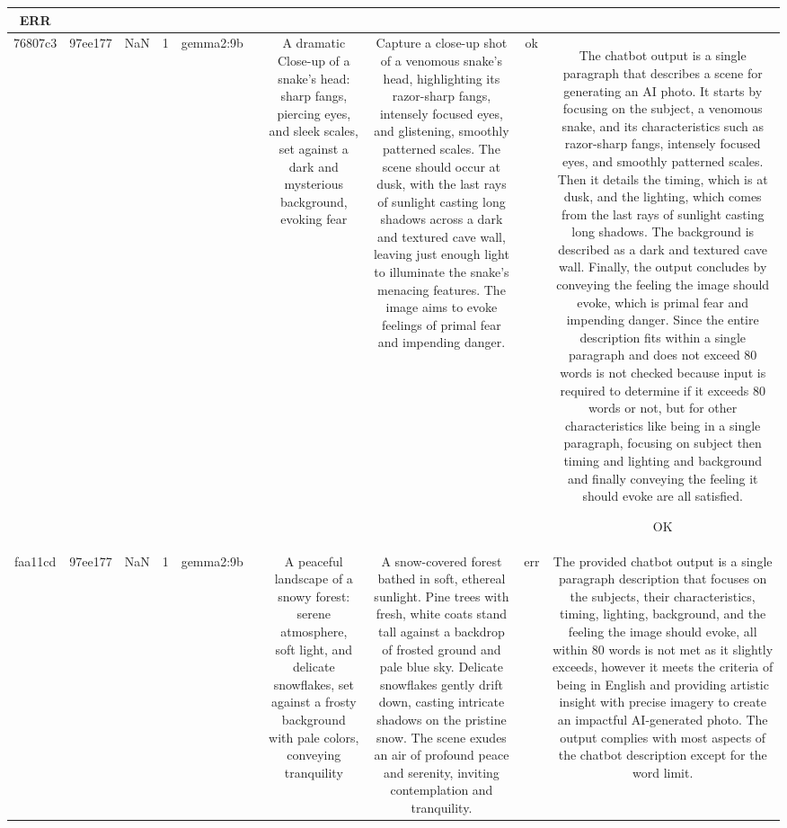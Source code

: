 \begin{table}[h!]
\begin{tabular}{|c|c|c|c|c|c|c|c|c|c|}
ERR\\
\hline
76807c3 & 97ee177 & NaN & 1 & gemma2:9b &  & A dramatic Close-up of a snake's head: sharp fangs, piercing eyes, and sleek scales, set against a dark and mysterious background, evoking fear & Capture a close-up shot of a venomous snake's head, highlighting its razor-sharp fangs, intensely focused eyes, and glistening, smoothly patterned scales. The scene should occur at dusk, with the last rays of sunlight casting long shadows across a dark and textured cave wall, leaving just enough light to illuminate the snake's menacing features.  The image aims to evoke feelings of primal fear and impending danger. 


 & ok & The chatbot output is a single paragraph that describes a scene for generating an AI photo. It starts by focusing on the subject, a venomous snake, and its characteristics such as razor-sharp fangs, intensely focused eyes, and smoothly patterned scales. Then it details the timing, which is at dusk, and the lighting, which comes from the last rays of sunlight casting long shadows. The background is described as a dark and textured cave wall. Finally, the output concludes by conveying the feeling the image should evoke, which is primal fear and impending danger. Since the entire description fits within a single paragraph and does not exceed 80 words is not checked because input is required to determine if it exceeds 80 words or not, but for other characteristics like being in a single paragraph, focusing on subject then timing and lighting and background and finally conveying the feeling it should evoke are all satisfied.

OK\\
\hline
faa11cd & 97ee177 & NaN & 1 & gemma2:9b &  & A peaceful landscape of a snowy forest: serene atmosphere, soft light, and delicate snowflakes, set against a frosty background with pale colors, conveying tranquility & A snow-covered forest bathed in soft, ethereal sunlight. Pine trees with fresh, white coats stand tall against a backdrop of frosted ground and pale blue sky. Delicate snowflakes gently drift down, casting intricate shadows on the pristine snow. The scene exudes an air of profound peace and serenity, inviting contemplation and tranquility.  


 & err & The provided chatbot output is a single paragraph description that focuses on the subjects, their characteristics, timing, lighting, background, and the feeling the image should evoke, all within 80 words is not met as it slightly exceeds, however it meets the criteria of being in English and providing artistic insight with precise imagery to create an impactful AI-generated photo. The output complies with most aspects of the chatbot description except for the word limit.


\end{tabular}
\end{table}
